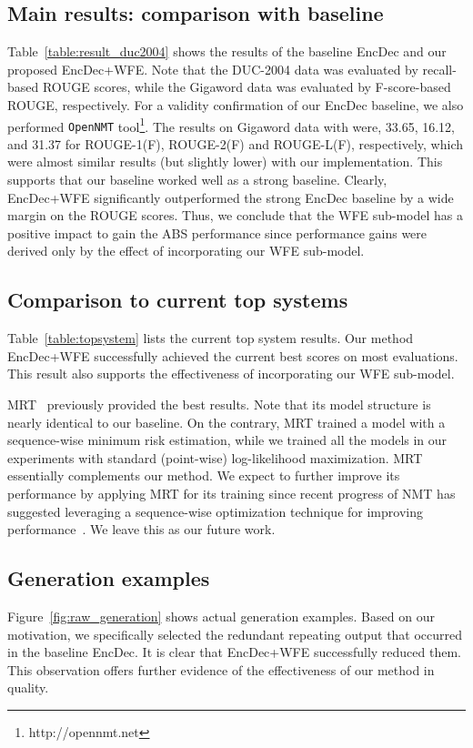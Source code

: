 \documentclass[11pt]{article}
\begin{document}
\subsection{Main results: comparison with baseline}
   Table~\ref{table:result_duc2004} shows the results of the baseline EncDec and our proposed EncDec+WFE.
Note that the DUC-2004 data was evaluated by recall-based ROUGE scores, while the Gigaword data was evaluated by F-score-based ROUGE, respectively.
For a validity confirmation of our EncDec baseline, we also performed {\tt OpenNMT} tool\footnote{{{http://opennmt.net}}}.
    The results on Gigaword data with  were, 33.65, 16.12, and 31.37 for ROUGE-1(F), ROUGE-2(F) and ROUGE-L(F), respectively, which were almost similar results (but slightly lower) with our implementation.
This supports that our baseline worked well as a strong baseline.
Clearly, EncDec+WFE significantly outperformed the strong EncDec baseline by a wide margin on the ROUGE scores. 
    Thus, we conclude that the WFE sub-model has a positive impact to gain the ABS performance
   since performance gains were derived only by the effect of incorporating our WFE sub-model. 


\subsection{Comparison to current top systems}
   Table~\ref{table:topsystem} lists the current top system results.
Our method EncDec+WFE successfully achieved the current best scores on most evaluations.
This result also supports the effectiveness of incorporating our WFE sub-model.
   
   MRT~\cite{DBLP:journals/corr/AyanaSLS16} previously provided the best results.
Note that its model structure is nearly identical to our baseline.
On the contrary, MRT trained a model with a sequence-wise minimum risk estimation, while we trained all the models in our experiments with standard (point-wise) log-likelihood maximization.
MRT essentially complements our method.
   We expect to further improve its performance by applying MRT for its training since recent progress of NMT has suggested leveraging a sequence-wise optimization technique for improving performance~\cite{wiseman-rush:2016:EMNLP2016,shen-EtAl:2016:P16-1}.
We leave this as our future work.



\subsection{Generation examples}
Figure~\ref{fig:raw_generation} shows actual generation examples.
Based on our motivation, we specifically selected the redundant repeating output that occurred in the baseline EncDec.
It is clear that EncDec+WFE successfully reduced them.
This observation offers further evidence of the effectiveness of our method in quality.
\end{document}
